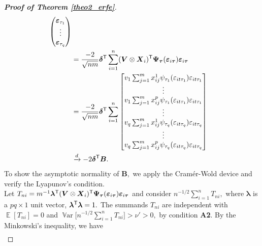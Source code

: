 \documentclass[15pt,a4paper]{article}
\DeclareMathOperator{\Var}{\mathbb{V}\text{ar}}
\DeclareMathOperator{\E}{\mathbb{E}}
\newcommand{\transpose}{{}^{\text{\sffamily T}}}
\begin{document}
\begin{proof}[\textbf{Proof of Theorem \ref{theo2_erfe}}]
\begin{align*}
\begin{split}
       \begin{pmatrix}
            \boldsymbol{\varepsilon}_{\tau_1} \\
            \vdots  \\
            \boldsymbol{\varepsilon}_{\tau_q} 
        \end{pmatrix}\\
    &=\frac{-2}{\sqrt{nm}}\boldsymbol{\delta}\transpose\sum_{i=1}^{n} (\boldsymbol{V}\otimes\boldsymbol{X}_i)
	\transpose\boldsymbol{\Psi}_{\boldsymbol{\tau}}(\boldsymbol{\varepsilon}_{i\boldsymbol{\tau}})\boldsymbol{\varepsilon}_{i\boldsymbol{\tau}}\\
        &=\frac{-2}{\sqrt{nm}}\boldsymbol{\delta}\transpose\sum_{i=1}^{n}
        \begin{bmatrix}
            v_1\sum_{j=1}^{m}x_{ij}^{1}\psi_{\tau_1}(\varepsilon_{it\tau_{1}})\varepsilon_{it\tau_{1}} \\
            \vdots \\
            v_1\sum_{j=1}^{m}x_{ij}^{p}\psi_{\tau_1}(\varepsilon_{it\tau_{1}})\varepsilon_{it\tau_{1}} \\
            \vdots \\
            v_q\sum_{j=1}^{m}x_{ij}^{1}\psi_{\tau_q}(\varepsilon_{it\tau_{q}})\varepsilon_{it\tau_{q}} \\
            \vdots \\
            v_q\sum_{j=1}^{m}x_{ij}^{p}\psi_{\tau_q}(\varepsilon_{it\tau_{q}})\varepsilon_{it\tau_{q}} \\
        \end{bmatrix}\\
    & \xrightarrow{d}-2\boldsymbol{\delta}\transpose\boldsymbol{B}.
\end{split}
\end{align*}
To show the asymptotic normality of $\boldsymbol{B},$ we apply the Cramér-Wold device and verify the Lyapunov's condition.
~~\\
Let $T_{ni}=m^{-1}\boldsymbol{\lambda}\transpose(\boldsymbol{V}\otimes\boldsymbol{X}_i)\transpose\boldsymbol{\Psi}_{\boldsymbol{\tau}}(
\boldsymbol{\varepsilon}_{i\boldsymbol{\tau}})\boldsymbol{\varepsilon}_{i\boldsymbol{\tau}}$
and consider $n^{-1/2}\sum_{i=1}^{n}T_{ni},$ where $\boldsymbol{\lambda}$ is a $pq \times 1$ unit vector, $\boldsymbol{\lambda}\transpose\boldsymbol{\lambda}=1.$ 
The summands $T_{ni}$ are independent with $\E[T_{ni}]=0$ and $\Var\Big[n^{-1/2}\sum_{i=1}^{n}T_{ni}\Big]>\nu\prime>0,$ by condition \textbf{A2}. By the Minkowski's inequality, we have
\begin{align*}

\end{align*}
\end{proof}
\end{document}
